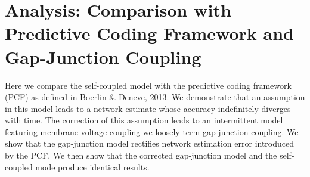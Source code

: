 \section{Analysis: Comparison with Predictive Coding Framework and Gap-Junction Coupling}


Here we compare the self-coupled model with the predictive coding framework (PCF) as defined in Boerlin \& Deneve, 2013. We demonstrate that an assumption in this model leads to a network estimate whose accuracy indefinitely diverges with time. The correction of this assumption leads to an intermittent model featuring membrane voltage coupling we loosely term gap-junction coupling. We show that the gap-junction model rectifies network estimation error introduced by the PCF. We then show that the corrected gap-junction model and the self-coupled mode produce identical results.

